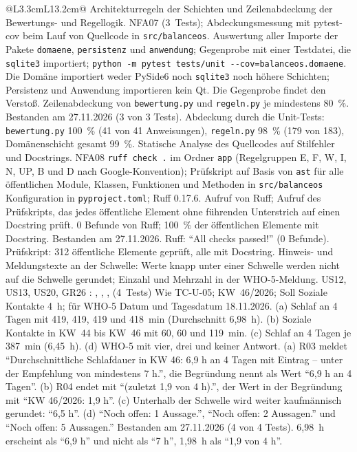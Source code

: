 \begin{longtable}{@{}L{3.3cm}L{13.2cm}@{}}
  \midrule
    {Architekturregeln der Schichten und Zeilenabdeckung der Bewertungs- und Regellogik.}
    {NFA07}
    { (3~Tests); Abdeckungsmessung mit pytest-cov beim Lauf von }
    {Quellcode in \texttt{src/balanceos}.}
    {Auswertung aller Importe der Pakete \texttt{domaene}, \texttt{persistenz} und \texttt{anwendung}; Gegenprobe mit einer Testdatei, die \texttt{sqlite3} importiert; \texttt{python -m pytest tests/unit -{}-cov=balanceos.domaene}.}
    {Die Domäne importiert weder PySide6 noch \texttt{sqlite3} noch höhere Schichten; Persistenz und Anwendung importieren kein Qt. Die Gegenprobe findet den Verstoß. Zeilenabdeckung von \texttt{bewertung.py} und \texttt{regeln.py} je mindestens 80~\%.}
    {Bestanden am 27.11.2026 (3 von 3 Tests). Abdeckung durch die Unit-Tests: \texttt{bewertung.py} 100~\% (41 von 41 Anweisungen), \texttt{regeln.py} 98~\% (179 von 183), Domänenschicht gesamt 99~\%.}
  \midrule
    {Statische Analyse des Quellcodes auf Stilfehler und Docstrings.}
    {NFA08}
    {\texttt{ruff check .} im Ordner \texttt{app} (Regelgruppen E, F, W, I, N, UP, B und D nach Google-Konvention); Prüfskript auf Basis von \texttt{ast} für alle öffentlichen Module, Klassen, Funktionen und Methoden in \texttt{src/balanceos}}
    {Konfiguration in \texttt{pyproject.toml}; Ruff 0.17.6.}
    {Aufruf von Ruff; Aufruf des Prüfskripts, das jedes öffentliche Element ohne führenden Unterstrich auf einen Docstring prüft.}
    {0 Befunde von Ruff; 100~\% der öffentlichen Elemente mit Docstring.}
    {Bestanden am 27.11.2026. Ruff: \enquote{All checks passed!} (0 Befunde). Prüfskript: 312 öffentliche Elemente geprüft, alle mit Docstring.}
  \midrule
    {Hinweis- und Meldungstexte an der Schwelle: Werte knapp unter einer Schwelle werden nicht auf die Schwelle gerundet; Einzahl und Mehrzahl in der WHO-5-Meldung.}
    {US12, US13, US20, GR26}
    {: , , ,  (4~Tests)}
    {Wie TC-U-05; KW~46/2026; Soll Soziale Kontakte 4~h; für WHO-5 Datum und Tagesdatum 18.11.2026.}
    {(a) Schlaf an 4 Tagen mit 419, 419, 419 und 418~min (Durchschnitt 6,98~h). (b) Soziale Kontakte in KW~44 bis KW~46 mit 60, 60 und 119~min. (c) Schlaf an 4 Tagen je 387~min (6,45~h). (d) WHO-5 mit vier, drei und keiner Antwort.}
    {(a) R03 meldet \enquote{Durchschnittliche Schlafdauer in KW 46: 6,9 h an 4 Tagen mit Eintrag -- unter der Empfehlung von mindestens 7 h.}, die Begründung nennt als Wert \enquote{6,9 h an 4 Tagen}. (b) R04 endet mit \enquote{(zuletzt 1,9 von 4 h).}, der Wert in der Begründung mit \enquote{KW 46/2026: 1,9 h}. (c) Unterhalb der Schwelle wird weiter kaufmännisch gerundet: \enquote{6,5 h}. (d) \enquote{Noch offen: 1 Aussage.}, \enquote{Noch offen: 2 Aussagen.} und \enquote{Noch offen: 5 Aussagen.}}
    {Bestanden am 27.11.2026 (4 von 4 Tests). 6,98~h erscheint als \enquote{6,9 h} und nicht als \enquote{7 h}, 1,98~h als \enquote{1,9 von 4 h}.}
\end{longtable}
